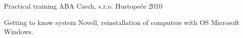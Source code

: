 \begin{cventries}
   \cventry
   {Practical training}
   {ABA Czech, s.r.o.}
   {Hustopeče}
   {2010}
   {
    \begin{cvitems}
      \item {Getting to know system Novell, reinstallation of computers with OS Microsoft Windows.}
    \end{cvitems}
   }

\end{cventries}